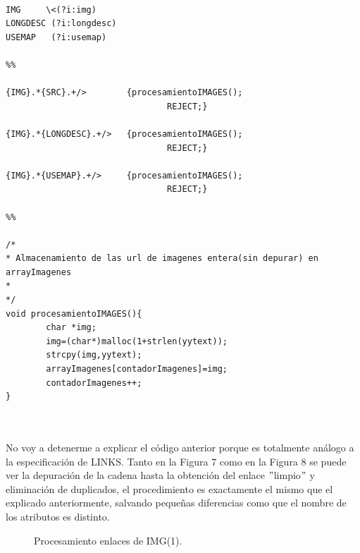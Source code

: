 \documentclass[10pt, a4paper,spanish]{article}
\begin{document}
\begin{lstlisting}

IMG     \<(?i:img)
LONGDESC (?i:longdesc)
USEMAP   (?i:usemap)

%%

{IMG}.*{SRC}.+/>        {procesamientoIMAGES();
                                REJECT;}

{IMG}.*{LONGDESC}.+/>   {procesamientoIMAGES();
                                REJECT;}

{IMG}.*{USEMAP}.+/>     {procesamientoIMAGES();
                                REJECT;}
                                
%%

/*
* Almacenamiento de las url de imagenes entera(sin depurar) en arrayImagenes
*
*/
void procesamientoIMAGES(){
        char *img;
        img=(char*)malloc(1+strlen(yytext));
        strcpy(img,yytext);
        arrayImagenes[contadorImagenes]=img;
        contadorImagenes++;
}


\end{lstlisting}

\noindent  \\ No voy a detenerme a explicar el código anterior porque es totalmente análogo a la especificación de LINKS. Tanto en la Figura 7 como en la Figura 8 se puede ver la depuración de la cadena hasta la obtención del enlace $"$limpio$"$ y eliminación de duplicados, el procedimiento es exactamente el mismo que el explicado anteriormente, salvando pequeñas diferencias como que el nombre de los atributos es distinto. \\
\bigskip
\begin{figure}[H]
  \centering
  \caption{Procesamiento enlaces de IMG(1).}
\end{figure}
\end{document}
